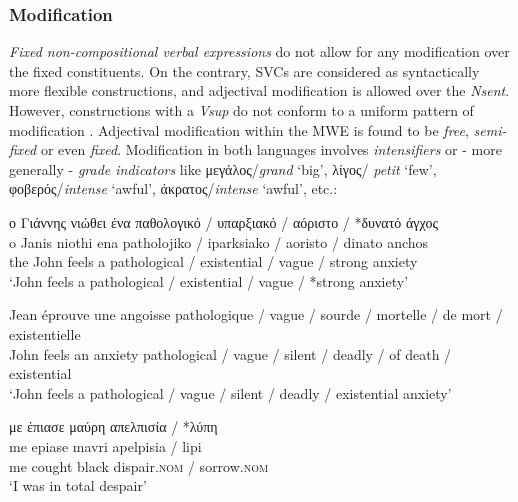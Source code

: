 \documentclass[output=paper]{langsci/langscibook}
\begin{document}
\subsubsection{Modification}
\label{section522}

\textit{Fixed non-compositional verbal expressions} do not
allow for any modification over the fixed constituents. On the
contrary, SVCs are considered as syntactically more flexible
constructions, and adjectival modification is allowed over the
\textit{Nsent}. However, constructions with a \textit{Vsup} do not
conform to a uniform pattern of modification \citep{moustaki2008}. 
Adjectival modification within the MWE is found to be
\textit{free}, \textit{semi-fixed} or even
\textit{fixed}. Modification in both languages involves
\textit{intensifiers} or - more generally -
\textit{grade indicators}  like μεγάλος/\textit{grand} ‘big’, λίγος/\textit{ petit} ‘few’,
φοβερός/\textit{intense }‘awful’,
 άκρατος/\textit{intense }‘awful’, etc.:


\begin{exe}
\ex \label{ex:3:25}
\glll ο Γιάννης νιώθει ένα παθολογικό / υπαρξιακό / αόριστο / *δυνατό άγχος\\
o Janis niothi ena patholojiko / iparksiako / aoristo / dinato anchos\\
the John feels a pathological / existential / vague / strong anxiety\\
\glt ‘John feels a pathological / existential / vague / *strong anxiety’
\end{exe}

\begin{exe}
\ex \label{ex:3:26}
\gll Jean éprouve une angoisse pathologique / vague / sourde / mortelle / de mort / existentielle \\
John feels an anxiety pathological / vague / silent / deadly / of death / existential\\
\glt ‘John feels a pathological / vague / silent / deadly / existential anxiety’
\end{exe}

\begin{exe}
\ex \label{ex:3:27}
\glll με έπιασε μαύρη απελπισία / *λύπη \\
 me epiase mavri apelpisia / lipi\\
me cought black dispair.\textsc{nom} / sorrow.\textsc{nom}\\
\glt %
‘I was in total despair’
\end{exe}
\end{document}
